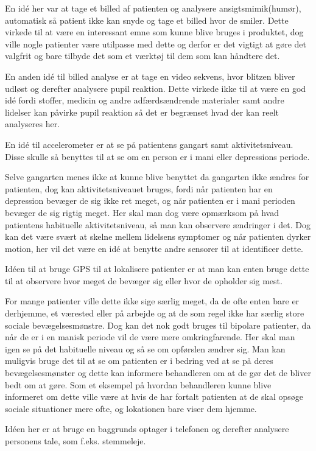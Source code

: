 \begin{description}[style=nextline]
\item[Billed analyse]
	En idé her var at tage et billed af patienten og analysere ansigtsmimik(humør), automatisk så patient ikke kan snyde og tage et billed hvor de smiler.
	Dette virkede til at være en interessant emne som kunne blive bruges i produktet, dog ville nogle patienter være utilpasse med dette og derfor er det vigtigt at gøre det valgfrit og bare tilbyde det som et værktøj til dem som kan håndtere det.
	
	En anden idé til billed analyse er at tage en video sekvens, hvor blitzen bliver udløst og derefter analysere pupil reaktion.
	Dette virkede ikke til at være en god idé fordi stoffer, medicin og andre adfærdsændrende materialer samt andre lidelser kan påvirke pupil reaktion så det er begrænset hvad der kan reelt analyseres her.
\item[Accelerometer]
	En idé til accelerometer er at se på patientens gangart samt aktivitetsniveau. Disse skulle så benyttes til at se om en person er i mani eller depressions periode.
	
	Selve gangarten menes ikke at kunne blive benyttet da gangarten ikke ændres for patienten, dog kan aktivitetsniveauet bruges, fordi når patienten har en depression bevæger de sig ikke ret meget, og når patienten er i mani perioden bevæger de sig rigtig meget. 
	Her skal man dog være opmærksom på hvad patientens habituelle aktivitetsniveau, så man kan observere ændringer i det.
	Dog kan det være svært at skelne mellem lidelsens symptomer og når patienten dyrker motion, her vil det være en idé at benytte andre sensorer til at identificer dette.
\item[Lokation]
	Idéen til at bruge GPS til at lokalisere patienter er at man kan enten bruge dette til at observere hvor meget de bevæger sig eller hvor de opholder sig mest. 
	
	For mange patienter ville dette ikke sige særlig meget, da de ofte enten bare er derhjemme, et værested eller på arbejde og at de som regel ikke har særlig store sociale bevægelsesmønstre. 
	Dog kan det nok godt bruges til bipolare patienter, da når de er i en manisk periode vil de være mere omkringfarende. 
	Her skal man igen se på det habituelle niveau og så se om opførslen ændrer sig. 
	Man kan muligvis bruge det til at se om patienten er i bedring ved at se på deres bevægelsesmønster og dette kan informere behandleren om at de gør det de bliver bedt om at gøre. 
	Som et eksempel på hvordan behandleren kunne blive informeret om dette ville være at hvis de har fortalt patienten at de skal opsøge sociale situationer mere ofte, og lokationen bare viser dem hjemme.
\item[Lyd]
	Idéen her er at bruge en baggrunds optager i telefonen og derefter analysere personens tale, som f.eks. stemmeleje. 
	

\end{description}
